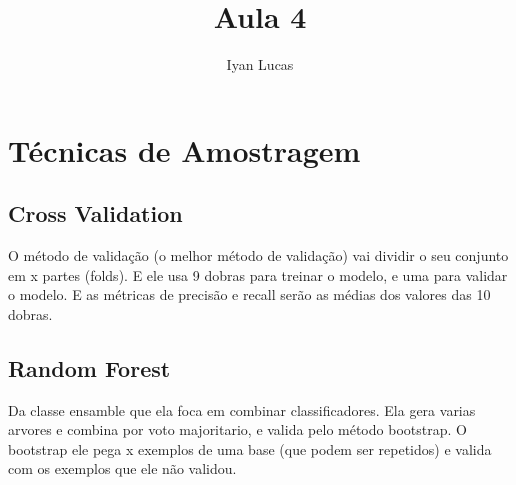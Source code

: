\documentclass[oneside]{article}            %
\title{Aula 4}
\author{Iyan Lucas}
\begin{document}
\maketitle
\section{Técnicas de Amostragem}
\subsection{Cross Validation}
O método de validação (o melhor método de validação) vai dividir o seu conjunto em x partes (folds).
E ele usa 9 dobras para treinar o modelo, e uma para validar o modelo. 
E as métricas de precisão e recall serão as médias dos valores das 10 dobras.
\subsection{Random Forest}
Da classe ensamble que ela foca em combinar classificadores.
Ela gera varias arvores e combina por voto majoritario, e valida pelo método bootstrap.
O bootstrap ele pega x exemplos de uma base (que podem ser repetidos) e valida com os exemplos que ele não validou.
\end{document}
